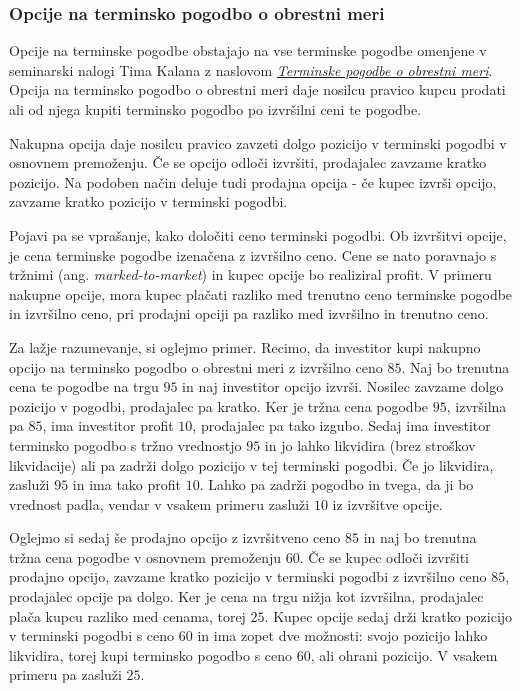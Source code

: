 \documentclass[a4paper]{article}
\begin{document}
\subsubsection{Opcije na terminsko pogodbo o obrestni meri}
Opcije na terminske pogodbe obstajajo na vse terminske pogodbe omenjene v seminarski nalogi Tima Kalana z naslovom 
\href{https://github.com/timkalan/seminar2020}{\textit{Terminske pogodbe o obrestni meri}}. Opcija na terminsko pogodbo o obrestni meri  daje nosilcu pravico
kupcu prodati ali od njega kupiti terminsko pogodbo po izvršilni ceni te pogodbe.

Nakupna opcija daje nosilcu pravico zavzeti dolgo pozicijo v terminski pogodbi v osnovnem premoženju. Če se opcijo odloči izvršiti,
prodajalec zavzame kratko pozicijo. Na podoben način deluje tudi prodajna opcija - če kupec izvrši opcijo, zavzame kratko pozicijo v terminski
pogodbi. 

Pojavi pa se vprašanje, kako določiti ceno terminski pogodbi. Ob izvršitvi opcije, je cena terminske pogodbe izenačena z izvršilno ceno.
Cene se nato poravnajo s tržnimi (ang. \textit{marked-to-market}) in kupec opcije bo realiziral profit. V primeru nakupne opcije, mora kupec plačati razliko med trenutno
ceno terminske pogodbe in izvršilno ceno, pri prodajni opciji pa razliko med izvršilno in trenutno ceno.

Za lažje razumevanje, si oglejmo primer. Recimo, da investitor kupi nakupno opcijo na terminsko pogodbo o obrestni meri z izvršilno ceno
\textdollar$85$. Naj bo trenutna cena te pogodbe na trgu \textdollar$95$  in naj investitor opcijo izvrši. Nosilec zavzame dolgo pozicijo v pogodbi, prodajalec
pa kratko. Ker je tržna cena pogodbe \textdollar$95$, izvršilna pa \textdollar$85$, ima investitor profit \textdollar$10$, prodajalec pa tako izgubo. Sedaj ima
investitor terminsko pogodbo s tržno vrednostjo \textdollar$95$ in jo lahko likvidira (brez stroškov likvidacije) ali pa zadrži dolgo pozicijo v
tej terminski pogodbi. Če jo likvidira, zasluži \textdollar$95$ in ima tako profit \textdollar$10$. Lahko pa zadrži pogodbo in tvega, da ji bo vrednost padla,
vendar v vsakem primeru zasluži \textdollar$10$ iz izvršitve opcije.

Oglejmo si sedaj še prodajno opcijo z izvršitveno ceno \textdollar$85$ in naj bo trenutna tržna cena pogodbe v osnovnem premoženju \textdollar$60$. Če se kupec odloči
izvršiti prodajno opcijo, zavzame kratko pozicijo v terminski pogodbi z izvršilno ceno \textdollar$85$, prodajalec opcije pa dolgo. Ker je cena
na trgu nižja kot izvršilna, prodajalec plača kupcu razliko med cenama, torej \textdollar$25$. Kupec opcije sedaj drži kratko pozicijo
v terminski pogodbi s ceno 60 in ima zopet dve možnosti: svojo pozicijo lahko likvidira, torej kupi terminsko pogodbo s ceno \textdollar$60$, ali
ohrani pozicijo. V vsakem primeru pa zasluži \textdollar$25$.
\end{document}
